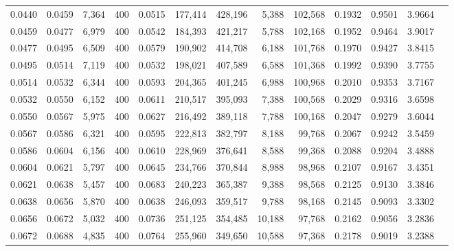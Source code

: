 \begin{tabular}{rrrrrrrrrrrrr}
0.0440 & 0.0459 &  7,364 &   400 &                                     0.0515 & 177,414 & 428,196 &   5,388 & 102,568 & 0.1932 & 0.9501 & 3.9664 \\
0.0459 & 0.0477 &  6,979 &   400 &                                     0.0542 & 184,393 & 421,217 &   5,788 & 102,168 & 0.1952 & 0.9464 & 3.9017 \\
0.0477 & 0.0495 &  6,509 &   400 &                                     0.0579 & 190,902 & 414,708 &   6,188 & 101,768 & 0.1970 & 0.9427 & 3.8415 \\
0.0495 & 0.0514 &  7,119 &   400 &                                     0.0532 & 198,021 & 407,589 &   6,588 & 101,368 & 0.1992 & 0.9390 & 3.7755 \\
0.0514 & 0.0532 &  6,344 &   400 &                                     0.0593 & 204,365 & 401,245 &   6,988 & 100,968 & 0.2010 & 0.9353 & 3.7167 \\
0.0532 & 0.0550 &  6,152 &   400 &                                     0.0611 & 210,517 & 395,093 &   7,388 & 100,568 & 0.2029 & 0.9316 & 3.6598 \\
0.0550 & 0.0567 &  5,975 &   400 &                                     0.0627 & 216,492 & 389,118 &   7,788 & 100,168 & 0.2047 & 0.9279 & 3.6044 \\
0.0567 & 0.0586 &  6,321 &   400 &                                     0.0595 & 222,813 & 382,797 &   8,188 &  99,768 & 0.2067 & 0.9242 & 3.5459 \\
0.0586 & 0.0604 &  6,156 &   400 &                                     0.0610 & 228,969 & 376,641 &   8,588 &  99,368 & 0.2088 & 0.9204 & 3.4888 \\
0.0604 & 0.0621 &  5,797 &   400 &                                     0.0645 & 234,766 & 370,844 &   8,988 &  98,968 & 0.2107 & 0.9167 & 3.4351 \\
0.0621 & 0.0638 &  5,457 &   400 &                                     0.0683 & 240,223 & 365,387 &   9,388 &  98,568 & 0.2125 & 0.9130 & 3.3846 \\
0.0638 & 0.0656 &  5,870 &   400 &                                     0.0638 & 246,093 & 359,517 &   9,788 &  98,168 & 0.2145 & 0.9093 & 3.3302 \\
0.0656 & 0.0672 &  5,032 &   400 &                                     0.0736 & 251,125 & 354,485 &  10,188 &  97,768 & 0.2162 & 0.9056 & 3.2836 \\
0.0672 & 0.0688 &  4,835 &   400 &                                     0.0764 & 255,960 & 349,650 &  10,588 &  97,368 & 0.2178 & 0.9019 & 3.2388 \\

\end{tabular}
